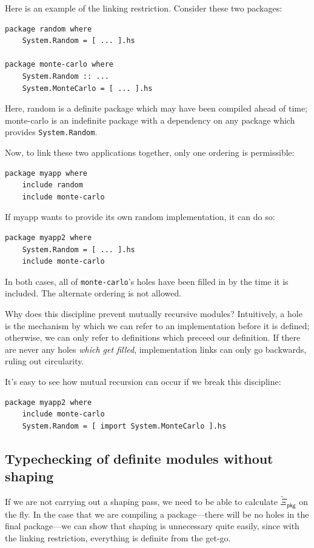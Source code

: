 \documentclass{article}
\begin{document}
Here is an example of the linking restriction. Consider these two packages:

\begin{verbatim}
package random where
    System.Random = [ ... ].hs

package monte-carlo where
    System.Random :: ...
    System.MonteCarlo = [ ... ].hs
\end{verbatim}

Here, random is a definite package which may have been compiled ahead
of time; monte-carlo is an indefinite package with a dependency
on any package which provides \verb|System.Random|.

Now, to link these two applications together, only one ordering
is permissible:

\begin{verbatim}
package myapp where
    include random
    include monte-carlo
\end{verbatim}

If myapp wants to provide its own random implementation, it can do so:

\begin{verbatim}
package myapp2 where
    System.Random = [ ... ].hs
    include monte-carlo
\end{verbatim}

In both cases, all of \verb|monte-carlo|'s holes have been filled in by the time
it is included.  The alternate ordering is not allowed.

Why does this discipline prevent mutually recursive modules?  Intuitively,
a hole is the mechanism by which we can refer to an implementation
before it is defined; otherwise, we can only refer to definitions which
preceed our definition. If there are never any holes \emph{which get filled},
implementation links can only go backwards, ruling out circularity.

It's easy to see how mutual recursion can occur if we break this discipline:

\begin{verbatim}
package myapp2 where
    include monte-carlo
    System.Random = [ import System.MonteCarlo ].hs
\end{verbatim}

\subsection{Typechecking of definite modules without shaping}

If we are not carrying out a shaping pass, we need to be able to calculate
$\widetilde{\Xi}_{\mathsf{pkg}}$ on the fly.  In the case that we are
compiling a package---there will be no holes in the final package---we
can show that shaping is unnecessary quite easily, since with the
linking restriction, everything is definite from the get-go.
\end{document}
